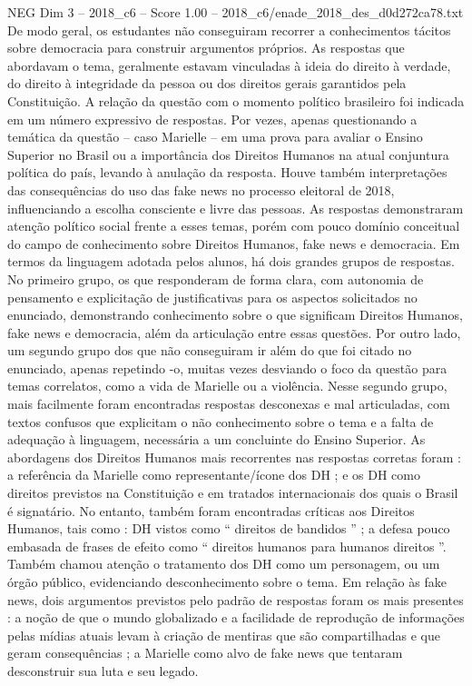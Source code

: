 \begin{textsample}{NEG Dim 3 – 2018\_c6 – Score 1.00 – 2018\_c6/enade\_2018\_des\_d0d272ca78.txt}
De modo geral, os estudantes não conseguiram recorrer a conhecimentos tácitos sobre democracia para construir argumentos próprios.
As respostas que abordavam o tema, geralmente estavam vinculadas à ideia do direito à verdade, do direito à integridade da pessoa ou dos direitos gerais garantidos pela Constituição.
A relação da questão com o momento político brasileiro foi indicada em um número expressivo de respostas.
Por vezes, apenas questionando a temática da questão – caso Marielle – em uma prova para avaliar o Ensino Superior no Brasil ou a importância dos Direitos Humanos na atual conjuntura política do país, levando à anulação da resposta.
Houve também interpretações das consequências do uso das fake news no processo eleitoral de 2018, influenciando a escolha consciente e livre das pessoas.
As respostas demonstraram atenção político social frente a esses temas, porém com pouco domínio conceitual do campo de conhecimento sobre Direitos Humanos, fake news e democracia.
Em termos da linguagem adotada pelos alunos, há dois grandes grupos de respostas.
No primeiro grupo, os que responderam de forma clara, com autonomia de pensamento e explicitação de justificativas para os aspectos solicitados no enunciado, demonstrando conhecimento sobre o que significam Direitos Humanos, fake news e democracia, além da articulação entre essas questões.
Por outro lado, um segundo grupo dos que não conseguiram ir além do que foi citado no enunciado, apenas repetindo -o, muitas vezes desviando o foco da questão para temas correlatos, como a vida de Marielle ou a violência.
Nesse segundo grupo, mais facilmente foram encontradas respostas desconexas e mal articuladas, com textos confusos que explicitam o não conhecimento sobre o tema e a falta de adequação à linguagem, necessária a um concluinte do Ensino Superior.
As abordagens dos Direitos Humanos mais recorrentes nas respostas corretas foram : a referência da Marielle como representante/ícone dos DH ; e os DH como direitos previstos na Constituição e em tratados internacionais dos quais o Brasil é signatário.
No entanto, também foram encontradas críticas aos Direitos Humanos, tais como : DH vistos como “ direitos de bandidos ” ; a defesa pouco embasada de frases de efeito como “ direitos humanos para humanos direitos ”.
Também chamou atenção o tratamento dos DH como um personagem, ou um órgão público, evidenciando desconhecimento sobre o tema.
Em relação às fake news, dois argumentos previstos pelo padrão de respostas foram os mais presentes : a noção de que o mundo globalizado e a facilidade de reprodução de informações pelas mídias atuais levam à criação de mentiras que são compartilhadas e que geram consequências ; a Marielle como alvo de fake news que tentaram desconstruir sua luta e seu legado.

\end{textsample}
